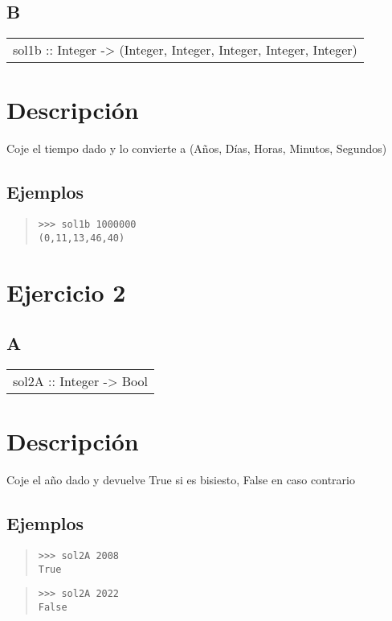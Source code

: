 \subsection{B}
\begin{haddockdesc}
\item[\begin{tabular}{@{}l}
sol1b :: Integer -> (Integer, Integer, Integer, Integer, Integer)
\end{tabular}]
{\haddockbegindoc
\section*{Descripción}
Coje el tiempo dado y lo convierte a (Años, Días, Horas, Minutos, Segundos)\par
\subsection*{Ejemplos}
\begin{quote}
{\haddockverb\begin{verbatim}
>>> sol1b 1000000
(0,11,13,46,40)

\end{verbatim}}
\end{quote}}
\end{haddockdesc}
\section{Ejercicio 2}
\subsection{A}
\begin{haddockdesc}
\item[\begin{tabular}{@{}l}
sol2A :: Integer -> Bool
\end{tabular}]
{\haddockbegindoc
\section*{Descripción}
Coje el año dado y devuelve True si es bisiesto, False en caso contrario\par
\subsection*{Ejemplos}
\begin{quote}
{\haddockverb\begin{verbatim}
>>> sol2A 2008
True

\end{verbatim}}
\end{quote}
\begin{quote}
{\haddockverb\begin{verbatim}
>>> sol2A 2022
False

\end{verbatim}}
\end{quote}}
\end{haddockdesc}
